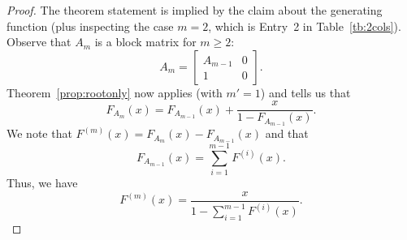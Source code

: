 \documentclass[12pt]{amsart}
\newcommand{\gfll}[1]{F_{#1}(x)}
\newcommand{\gfnoa}[1]{F^{(#1)}(x)}
\begin{document}
\begin{proof}    
    The 
    theorem statement is implied by the claim about the generating function (plus inspecting the case $m=2$, which is Entry~2 in Table~\ref{tb:2cols}). Observe that $A_m$ is a block matrix for $m\geq2$:
    \[
    A_m=\left[\begin{array}{c|c}A_{m-1}&0\\\hline1&0\end{array}\right].
    \]
    Theorem~\ref{prop:rootonly} now applies (with $m'=1$) and tells us that
    \[
    \gfll{A_m}=\gfll{A_{m-1}}+\frac{x}{1-\gfll{A_{m-1}}}.
    \]
    We note that $\gfnoa{m}=\gfll{A_m}-\gfll{A_{m-1}}$ and that
    \[
    \gfll{A_{m-1}}=\sum_{i=1}^{m-1}\gfnoa{i}.
    \]
    Thus, we have
    \[
    \gfnoa{m}=\frac{x}{1-\sum_{i=1}^{m-1}\gfnoa{i}}.
    \]


\end{proof}
\end{document}
